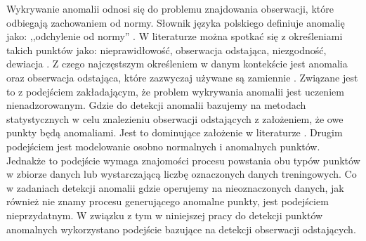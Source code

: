 Wykrywanie anomalii odnosi się do problemu znajdowania obserwacji, które odbiegają zachowaniem od normy. Słownik języka polskiego definiuje anomalię jako: ,,odchylenie od normy'' \cite{pwn}. 
W literaturze można spotkać się z określeniami takich punktów jako: nieprawidłowość, obserwacja odstająca, niezgodność, dewiacja \cite{aggarwal2017outlier}. Z czego najczęstszym określeniem w danym kontekście jest anomalia oraz obserwacja odstająca, które zazwyczaj używane są zamiennie \cite{chandola2009anomaly}. Związane jest to z podejściem zakładającym, że problem wykrywania anomalii jest uczeniem nienadzorowanym. Gdzie do detekcji anomalii bazujemy na metodach statystycznych w celu znalezieniu obserwacji odstających z założeniem, że owe punkty będą anomaliami. Jest to dominujące założenie w literaturze \cite{emmott2015meta}. Drugim podejściem jest modelowanie osobno normalnych i anomalnych punktów. Jednakże to podejście wymaga znajomości procesu powstania obu typów punktów w zbiorze danych lub wystarczającą liczbę oznaczonych danych treningowych. Co w zadaniach detekcji anomalii gdzie operujemy na nieoznaczonych danych, jak również nie znamy procesu generującego anomalne punkty, jest podejściem nieprzydatnym. W związku z tym w niniejszej pracy do detekcji punktów anomalnych wykorzystano podejście bazujące na detekcji obserwacji odstających.
